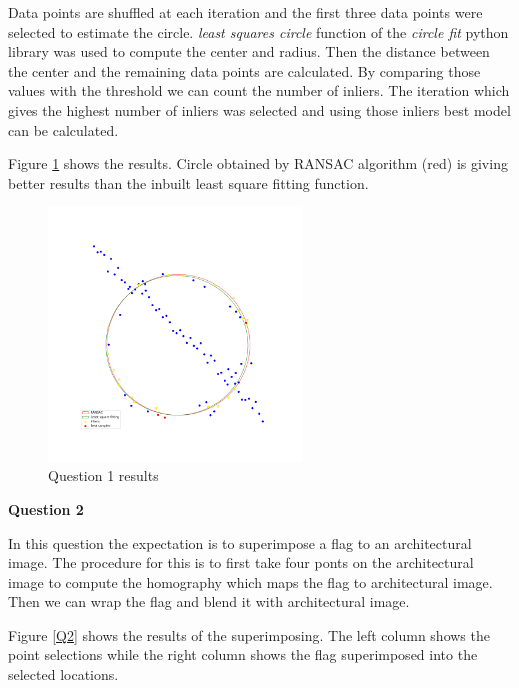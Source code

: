 \documentclass[11pt]{article}
\begin{document}
\noindent Data points are shuffled at each iteration and the first three data points were selected to estimate the circle. \textit{least squares circle} 
function of the \textit{circle fit} python library was used to compute the center and radius. Then the distance between the center and the remaining 
data points are calculated. By comparing those values with the threshold we can count the number of inliers. The iteration which gives the highest
number of inliers was selected and using those inliers best model can be calculated. 

\noindent Figure \ref{RANSAC} shows the results. Circle obtained by RANSAC algorithm (red) is giving better 
results than the inbuilt least square fitting function. \\

\begin{figure}[!h]
    \centering
    \includegraphics[width=0.6\textwidth]{Images/1.png}
    \caption{Question 1 results}
    \label{RANSAC}
\end{figure}

\newpage
\noindent \textbf{Question 2}

\noindent In this question the expectation is to superimpose a flag to an architectural image. The procedure for this is to first take four ponts
on the architectural image to compute the homography which maps the flag to architectural image. Then we can wrap the flag and blend it with architectural
image. 

\noindent Figure \ref{Q2} shows the results of the superimposing. The left column shows the point selections while the right column shows
the flag superimposed into the selected locations. \\
\end{document}
